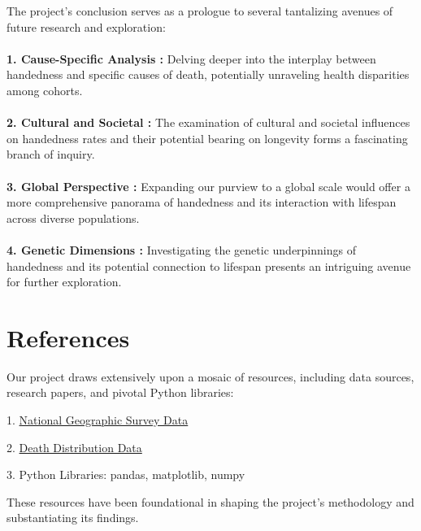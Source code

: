 \documentclass{article}
\begin{document}
The project's conclusion serves as a prologue to several tantalizing avenues of future research and exploration:\\ \\\textbf{1. Cause-Specific Analysis :} Delving deeper into the interplay between handedness and specific causes of death, potentially unraveling health disparities among cohorts.\\ \\\textbf{2. Cultural and Societal :} The examination of cultural and societal influences on handedness rates and their potential bearing on longevity forms a fascinating branch of inquiry.\\ \\\textbf{3. Global Perspective :} Expanding our purview to a global scale would offer a more comprehensive panorama of handedness and its interaction with lifespan across diverse populations.\\ \\ \textbf{4. Genetic Dimensions :} Investigating the genetic underpinnings of handedness and its potential connection to lifespan presents an intriguing avenue for further exploration.


\newpage

\section{References}


Our project draws extensively upon a mosaic of resources, including data sources, research papers, and pivotal Python libraries:

1. \href{https://drive.google.com/uc?export=download&id=1gSjYHJ8OPM9HMd3prr7XuhvSWWGKYZNE}{National Geographic Survey Data}

2. \href{https://www.cdc.gov/nchs/data/statab/vs00199_table310.pdf}{Death Distribution Data}

3. Python Libraries: pandas, matplotlib, numpy

These resources have been foundational in shaping the project's methodology and substantiating its findings.
\end{document}
